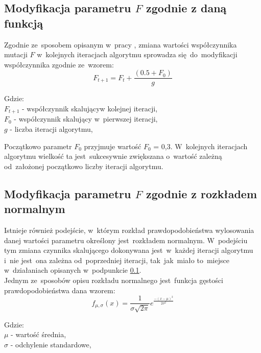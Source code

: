 \subsection{Modyfikacja parametru $F$ zgodnie z daną funkcją} \label{funkcja}

Zgodnie ze~sposobem opisanym w~pracy \cite{modf}, zmiana wartości współczynnika mutacji $F$ w~kolejnych iteracjach algorytmu sprowadza się~do~modyfikacji współczynnika zgodnie ze~wzorem:
\begin{equation}
F_{t+1} = F_{t} + \frac{(0.5 + F_0)}{g}
\end{equation}
\par
Gdzie:\\
$F_{t+1}$ - współczynnik skalującyw kolejnej iteracji,\\
$F_{0}$ - współczynnik skalujący w~pierwszej iteracji,\\
$g$ - liczba iteracji algorytmu,\\
\par
Początkowo parametr $F_{0}$ przyjmuje wartość $F_{0}$ = 0,3. W~kolejnych iteracjach algorytmu wielkość ta jest~sukcesywnie zwiększana o~wartość zależną od~założonej początkowo liczby iteracji algorytmu.
\par

\subsection{Modyfikacja parametru $F$ zgodnie z rozkładem normalnym} \label{gauss1}

Istnieje również podejście, w~którym rozkład prawdopodobieństwa wylosowania danej wartości parametru określony jest~rozkładem normalnym. W~podejściu tym zmiana czynnika skalującego dokonywana jest~w~każdej iteracji algorytmu i~nie jest~ona zależna od~poprzedniej iteracji, tak~jak~miało to~miejsce w~działaniach opisanych w~podpunkcie \ref{funkcja}. \\
Jednym ze~sposobów opisu rozkładu normalnego jest~funkcja gęstości prawdopodobieństwa dana wzorem:\\

\begin{equation}
f_{\mu, \sigma} (x) =  \frac{1}{\sigma\sqrt{2\pi}}e^{\frac{-(x-\mu)^2}{2\sigma^2}}
\end{equation}

Gdzie:\\
$\mu$ - wartość średnia,\\
$\sigma$ - odchylenie standardowe,\\

